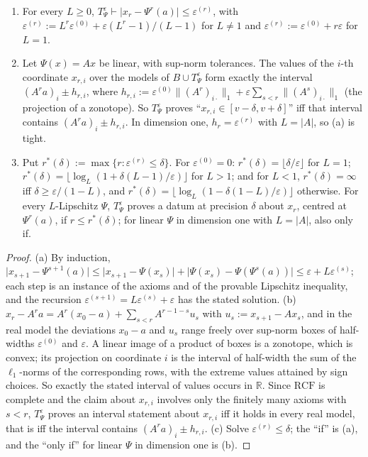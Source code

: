 \begin{proposition}\label{prop:laws:horizon}
\leavevmode
\begin{enumerate}[label=(\alph*),itemsep=1pt,topsep=2pt]
\item For every $L\ge0$, $T^\varepsilon_\Psi\vdash\lvert x_r-\Psi^r(a)\rvert\le\varepsilon^{(r)}$, with $\varepsilon^{(r)}:=L^r\varepsilon^{(0)}+\varepsilon(L^r-1)/(L-1)$ for $L\ne1$ and $\varepsilon^{(r)}:=\varepsilon^{(0)}+r\varepsilon$ for $L=1$.
\item Let $\Psi(x)=Ax$ be linear, with sup-norm tolerances. The values of the $i$-th coordinate $x_{r,i}$ over the models of $B\cup T^\varepsilon_\Psi$ form exactly the interval $(A^ra)_i\pm h_{r,i}$, where $h_{r,i}:=\varepsilon^{(0)}\lVert(A^r)_{i\cdot}\rVert_1+\varepsilon\sum_{s<r}\lVert(A^s)_{i\cdot}\rVert_1$ (the projection of a zonotope). So $T^\varepsilon_\Psi$ proves ``$x_{r,i}\in[v-\delta,v+\delta]$'' iff that interval contains $(A^ra)_i\pm h_{r,i}$. In dimension one, $h_r=\varepsilon^{(r)}$ with $L=\lvert A\rvert$, so (a) is tight.
\item Put $r^*(\delta):=\max\{r:\varepsilon^{(r)}\le\delta\}$. For $\varepsilon^{(0)}=0$: $r^*(\delta)=\lfloor\delta/\varepsilon\rfloor$ for $L=1$; $r^*(\delta)=\lfloor\log_L(1+\delta(L-1)/\varepsilon)\rfloor$ for $L>1$; and for $L<1$, $r^*(\delta)=\infty$ iff $\delta\ge\varepsilon/(1-L)$, and $r^*(\delta)=\lfloor\log_L(1-\delta(1-L)/\varepsilon)\rfloor$ otherwise. For every $L$-Lipschitz $\Psi$, $T^\varepsilon_\Psi$ proves a datum at precision $\delta$ about $x_r$, centred at $\Psi^r(a)$, if $r\le r^*(\delta)$; for linear $\Psi$ in dimension one with $L=\lvert A\rvert$, also only if.
\end{enumerate}
\end{proposition}

\begin{proof}
(a) By induction, $\lvert x_{s+1}-\Psi^{s+1}(a)\rvert\le\lvert x_{s+1}-\Psi(x_s)\rvert+\lvert\Psi(x_s)-\Psi(\Psi^s(a))\rvert\le\varepsilon+L\varepsilon^{(s)}$; each step is an instance of the axioms and of the provable Lipschitz inequality, and the recursion $\varepsilon^{(s+1)}=L\varepsilon^{(s)}+\varepsilon$ has the stated solution. (b) $x_r-A^ra=A^r(x_0-a)+\sum_{s<r}A^{r-1-s}u_s$ with $u_s:=x_{s+1}-Ax_s$, and in the real model the deviations $x_0-a$ and $u_s$ range freely over sup-norm boxes of half-widths $\varepsilon^{(0)}$ and $\varepsilon$. A linear image of a product of boxes is a zonotope, which is convex; its projection on coordinate $i$ is the interval of half-width the sum of the $\ell_1$-norms of the corresponding rows, with the extreme values attained by sign choices. So exactly the stated interval of values occurs in $\mathbb R$. Since $\mathrm{RCF}$ is complete and the claim about $x_{r,i}$ involves only the finitely many axioms with $s<r$, $T^\varepsilon_\Psi$ proves an interval statement about $x_{r,i}$ iff it holds in every real model, that is iff the interval contains $(A^ra)_i\pm h_{r,i}$. (c) Solve $\varepsilon^{(r)}\le\delta$; the ``if'' is (a), and the ``only if'' for linear $\Psi$ in dimension one is (b).
\end{proof}

